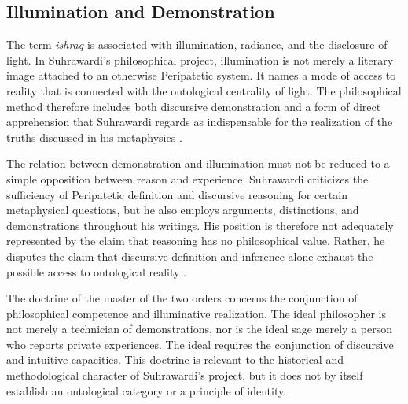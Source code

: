 
\subsection{Illumination and Demonstration}
\label{sec:ch08-s14-ss04}

\label{para:VS.B01.P01.C08.S14.SS04.P001}

The term \textit{ishraq} is associated with illumination,
radiance, and the disclosure of light. In Suhrawardi's
philosophical project, illumination is not merely a literary
image attached to an otherwise Peripatetic system. It names
a mode of access to reality that is connected with the
ontological centrality of light. The philosophical method
therefore includes both discursive demonstration and a
form of direct apprehension that Suhrawardi regards as
indispensable for the realization of the truths discussed
in his metaphysics \citep{ZiaiKnowledgeIllumination1990,MarcotteSuhrawardiSEP2019}.

\label{para:VS.B01.P01.C08.S14.SS04.P002}

The relation between demonstration and illumination must
not be reduced to a simple opposition between reason and
experience. Suhrawardi criticizes the sufficiency of
Peripatetic definition and discursive reasoning for certain
metaphysical questions, but he also employs arguments,
distinctions, and demonstrations throughout his writings.
His position is therefore not adequately represented by
the claim that reasoning has no philosophical value.
Rather, he disputes the claim that discursive definition
and inference alone exhaust the possible access to
ontological reality \citep{SuhrawardiPhilosophyIllumination,ZiaiKnowledgeIllumination1990}.

\label{para:VS.B01.P01.C08.S14.SS04.P003}

The doctrine of the master of the two orders concerns the
conjunction of philosophical competence and illuminative
realization. The ideal philosopher is not merely a
technician of demonstrations, nor is the ideal sage merely
a person who reports private experiences. The ideal
requires the conjunction of discursive and intuitive
capacities. This doctrine is relevant to the historical
and methodological character of Suhrawardi's project,
but it does not by itself establish an ontological category
or a principle of identity.

